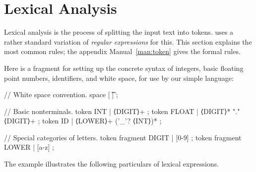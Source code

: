 \documentclass[11pt]{article} %
\begin{document}
\section{Lexical Analysis}
\label{sec:tokens}

Lexical analysis is the process of splitting the input text into tokens. \HAX uses a rather standard
variation of \emph{regular expressions} for this. This section explains the most common rules; the
appendix Manual~\ref{man:token} gives the formal rules.

\begin{example}\label{ex:lexical}
  Here is a \HAX fragment for setting up the concrete syntax of integers, basic floating point
  numbers, identifiers, and white space, for use by our simple language:
  \begin{hacs}[xleftmargin=\parindent,numbers=right,texcl]
// White space convention.
space [ \t\n] ;

// Basic nonterminals.
token INT      | ⟨DIGIT⟩+ ;
token FLOAT    | ⟨DIGIT⟩* "." ⟨DIGIT⟩+ ;
token ID       | ⟨LOWER⟩+ ('_'? ⟨INT⟩)* ;

// Special categories of letters.
token fragment DIGIT  | [0-9] ;
token fragment LOWER  | [a-z] ;
  \end{hacs}
\end{example}

The example illustrates the following particulars of \HAX lexical expressions.
\end{document}
